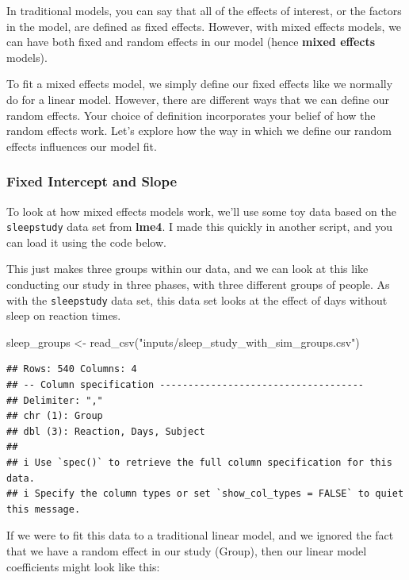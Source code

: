 \documentclass[
]{book}
\newenvironment{Shaded}{\begin{snugshade}}{\end{snugshade}}
\newcommand{\FunctionTok}[1]{\textcolor[rgb]{0.00,0.00,0.00}{#1}}
\newcommand{\NormalTok}[1]{#1}
\newcommand{\OtherTok}[1]{\textcolor[rgb]{0.56,0.35,0.01}{#1}}
\newcommand{\StringTok}[1]{\textcolor[rgb]{0.31,0.60,0.02}{#1}}
\begin{document}
In traditional models, you can say that all of the effects of interest, or the factors in the model, are defined as fixed effects. However, with mixed effects models, we can have both fixed and random effects in our model (hence \textbf{mixed effects} models).

To fit a mixed effects model, we simply define our fixed effects like we normally do for a linear model. However, there are different ways that we can define our random effects. Your choice of definition incorporates your belief of how the random effects work. Let's explore how the way in which we define our random effects influences our model fit.

\hypertarget{fixed-intercept-and-slope}{%
\subsubsection{Fixed Intercept and Slope}\label{fixed-intercept-and-slope}}

To look at how mixed effects models work, we'll use some toy data based on the \texttt{sleepstudy} data set from \textbf{lme4}. I made this quickly in another script, and you can load it using the code below.

This just makes three groups within our data, and we can look at this like conducting our study in three phases, with three different groups of people. As with the \texttt{sleepstudy} data set, this data set looks at the effect of days without sleep on reaction times.

\begin{Shaded}
\begin{Highlighting}[]
\NormalTok{sleep\_groups }\OtherTok{\textless{}{-}} \FunctionTok{read\_csv}\NormalTok{(}\StringTok{"inputs/sleep\_study\_with\_sim\_groups.csv"}\NormalTok{)}
\end{Highlighting}
\end{Shaded}

\begin{verbatim}
## Rows: 540 Columns: 4
## -- Column specification ------------------------------------
## Delimiter: ","
## chr (1): Group
## dbl (3): Reaction, Days, Subject
## 
## i Use `spec()` to retrieve the full column specification for this data.
## i Specify the column types or set `show_col_types = FALSE` to quiet this message.
\end{verbatim}

If we were to fit this data to a traditional linear model, and we ignored the fact that we have a random effect in our study (Group), then our linear model coefficients might look like this:
\end{document}
